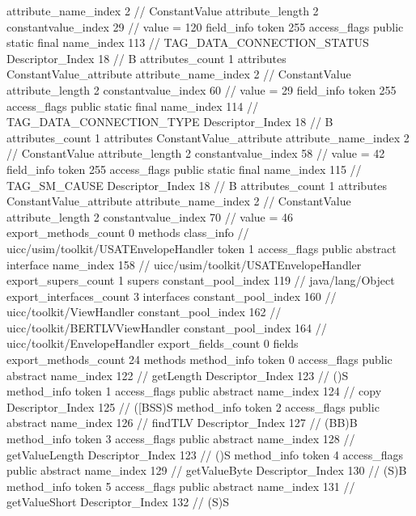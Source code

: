 {{{{{{{					attribute_name_index	2		// ConstantValue
					attribute_length	2
					constantvalue_index	29		// value = 120
				}
				}
			}
			field_info {
				token	255
				access_flags	public static final
				name_index	113		// TAG_DATA_CONNECTION_STATUS
				Descriptor_Index	18		// B
				attributes_count	1
				attributes {
				ConstantValue_attribute {
					attribute_name_index	2		// ConstantValue
					attribute_length	2
					constantvalue_index	60		// value = 29
				}
				}
			}
			field_info {
				token	255
				access_flags	public static final
				name_index	114		// TAG_DATA_CONNECTION_TYPE
				Descriptor_Index	18		// B
				attributes_count	1
				attributes {
				ConstantValue_attribute {
					attribute_name_index	2		// ConstantValue
					attribute_length	2
					constantvalue_index	58		// value = 42
				}
				}
			}
			field_info {
				token	255
				access_flags	public static final
				name_index	115		// TAG_SM_CAUSE
				Descriptor_Index	18		// B
				attributes_count	1
				attributes {
				ConstantValue_attribute {
					attribute_name_index	2		// ConstantValue
					attribute_length	2
					constantvalue_index	70		// value = 46
				}
				}
			}
			}
			export_methods_count	0
			methods {
			}
		}
		class_info {		// uicc/usim/toolkit/USATEnvelopeHandler
			token	1
			access_flags	public abstract interface
			name_index	158		// uicc/usim/toolkit/USATEnvelopeHandler
			export_supers_count	1
			supers {
				constant_pool_index	119		// java/lang/Object
			}
			export_interfaces_count	3
			interfaces {
				constant_pool_index	160		// uicc/toolkit/ViewHandler
				constant_pool_index	162		// uicc/toolkit/BERTLVViewHandler
				constant_pool_index	164		// uicc/toolkit/EnvelopeHandler
			}
			export_fields_count	0
			fields {
			}
			export_methods_count	24
			methods {
				method_info {
					token	0
					access_flags	public abstract
					name_index	122		// getLength
					Descriptor_Index	123		// ()S
				}
				method_info {
					token	1
					access_flags	public abstract
					name_index	124		// copy
					Descriptor_Index	125		// ([BSS)S
				}
				method_info {
					token	2
					access_flags	public abstract
					name_index	126		// findTLV
					Descriptor_Index	127		// (BB)B
				}
				method_info {
					token	3
					access_flags	public abstract
					name_index	128		// getValueLength
					Descriptor_Index	123		// ()S
				}
				method_info {
					token	4
					access_flags	public abstract
					name_index	129		// getValueByte
					Descriptor_Index	130		// (S)B
				}
				method_info {
					token	5
					access_flags	public abstract
					name_index	131		// getValueShort
					Descriptor_Index	132		// (S)S
}}}}}
